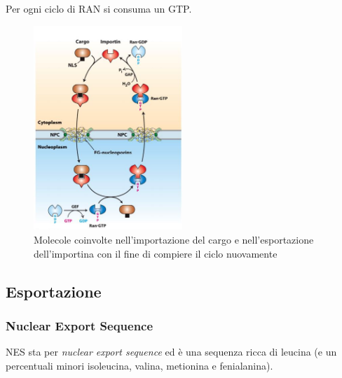             Per ogni ciclo di RAN si consuma un GTP.
            \begin{figure}[h]
                \centering
                \includegraphics[width=0.5\textwidth]{images/import-exportNucleo.JPG}
                \caption{\small Molecole coinvolte nell'importazione del cargo e nell'esportazione dell'importina con il fine di compiere il ciclo nuovamente}
                \label{fig:mesh1}
            \end{figure}
            
    \subsection{Esportazione}
        \subsubsection{Nuclear Export Sequence}
            NES sta per \textit{nuclear export sequence} ed è una sequenza ricca di leucina (e un percentuali minori isoleucina, valina, metionina e fenialanina).
            
